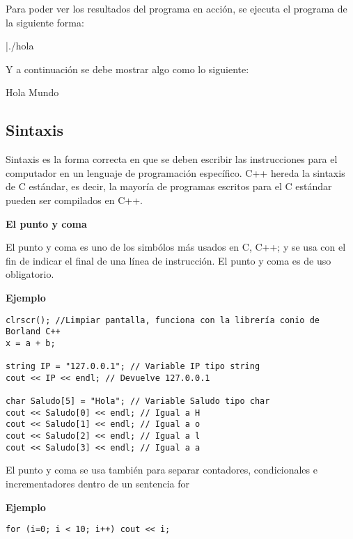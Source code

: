 Para poder ver los resultados del programa en acción, se ejecuta el programa de la siguiente forma:

\begin{listing}[style=consola, numbers=none,label=ejecutar,caption=Ejecutar]
|./hola
\end{listing}

Y a continuación se debe mostrar algo como lo siguiente:

\begin{listing}[style=consola, numbers=none,label=resultado,caption=Resultado]
Hola Mundo
\end{listing}

\subsection{Sintaxis}

Sintaxis es la forma correcta en que se deben escribir las instrucciones para el computador en un lenguaje de programación específico. C++ hereda la sintaxis de C estándar, es decir, la mayoría de programas escritos para el C estándar pueden ser compilados en C++.

\textbf{El punto y coma}

El punto y coma es uno de los simbólos más usados en C, C++; y se usa con el fin de indicar el final de una línea de instrucción. El punto y coma es de uso obligatorio.

\textbf{Ejemplo}

\begin{lstlisting}[style=Cpp, label=sintaxis, caption=Sintaxis]
clrscr(); //Limpiar pantalla, funciona con la librería conio de Borland C++
x = a + b;
 
string IP = "127.0.0.1"; // Variable IP tipo string
cout << IP << endl; // Devuelve 127.0.0.1
 
char Saludo[5] = "Hola"; // Variable Saludo tipo char
cout << Saludo[0] << endl; // Igual a H
cout << Saludo[1] << endl; // Igual a o
cout << Saludo[2] << endl; // Igual a l
cout << Saludo[3] << endl; // Igual a a
\end{lstlisting}

El punto y coma se usa también para separar contadores, condicionales e incrementadores dentro de un sentencia for

\textbf{Ejemplo}

\begin{lstlisting}[style=Cpp, label=sintaxis, caption=Sintaxis]
for (i=0; i < 10; i++) cout << i;
\end{lstlisting}

